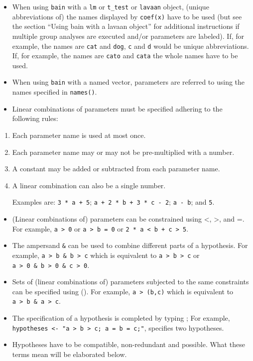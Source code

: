 \documentclass[
]{book}
\providecommand{\tightlist}{%
  \setlength{\itemsep}{0pt}\setlength{\parskip}{0pt}}
\begin{document}
\begin{itemize}
\tightlist
\item
  When using \texttt{bain} with a \texttt{lm} or \texttt{t\_test} or \texttt{lavaan} object,
  (unique abbreviations of) the names
  displayed by \texttt{coef(x)} have to be used (but see the section ``Using bain
  with a lavaan object'' for additional instructions if multiple group
  analyses are executed and/or parameters are labeled). If,
  for example, the names are \texttt{cat} and \texttt{dog}, \texttt{c}
  and \texttt{d} would be unique abbreviations. If, for example, the names are \texttt{cato}
  and \texttt{cata} the whole
  names have to be used.
\item
  When using \texttt{bain} with a named vector, parameters are referred to using
  the names specified in \texttt{names()}.
\item
  Linear combinations of parameters must be specified adhering to the
  following rules:
\end{itemize}

\begin{enumerate}
\def\labelenumi{\alph{enumi})}
\item
  Each parameter name is used at most once.
\item
  Each parameter name may or may not be pre-multiplied with a number.
\item
  A constant may be added or subtracted from each parameter name.
\item
  A linear combination can also be a single number.

  Examples are: \texttt{3\ *\ a\ +\ 5}; \texttt{a\ +\ 2\ *\ b\ +\ 3\ *\ c\ -\ 2}; \texttt{a\ -\ b}; and \texttt{5}.
\end{enumerate}

\begin{itemize}
\tightlist
\item
  (Linear combinations of) parameters can be constrained using \textless, \textgreater, and
  =. For example, \texttt{a\ \textgreater{}\ 0} or
  \texttt{a\ \textgreater{}\ b\ =\ 0} or \texttt{2\ *\ a\ \textless{}\ b\ +\ c\ \textgreater{}\ 5}.
\item
  The ampersand \texttt{\&} can be used to combine different parts of a hypothesis.
  For example, \texttt{a\ \textgreater{}\ b\ \&\ b\ \textgreater{}\ c} which is equivalent to \texttt{a\ \textgreater{}\ b\ \textgreater{}\ c} or
  \texttt{a\ \textgreater{}\ 0\ \&\ b\ \textgreater{}\ 0\ \&\ c\ \textgreater{}\ 0}.
\item
  Sets of (linear combinations of) parameters subjected to the same
  constraints can be specified using (). For
  example, \texttt{a\ \textgreater{}\ (b,c)} which is equivalent to \texttt{a\ \textgreater{}\ b\ \&\ a\ \textgreater{}\ c}.
\item
  The specification of a hypothesis is completed by typing ; For example,
  \texttt{hypotheses\ \textless{}-\ "a\ \textgreater{}\ b\ \textgreater{}\ c;\ a\ =\ b\ =\ c;"}, specifies two hypotheses.
\item
  Hypotheses have to be compatible, non-redundant and possible. What
  these terms mean will be elaborated below.
\end{itemize}
\end{document}
